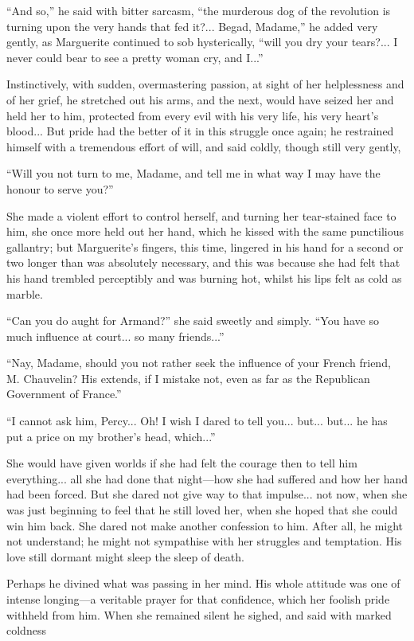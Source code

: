 \enquote{And so,} he said with bitter sarcasm, \enquote{the murderous dog of the revolution is turning upon the very hands that fed it?... Begad, Madame,} he added very gently, as Marguerite continued to sob hysterically, \enquote{will you dry your tears?... I never could bear to see a pretty woman cry, and I...}

Instinctively, with sudden, overmastering passion, at sight of her helplessness and of her grief, he stretched out his arms, and the next, would have seized her and held her to him, protected from every evil with his very life, his very heart's blood... But pride had the better of it in this struggle once again; he restrained himself with a tremendous effort of will, and said coldly, though still very gently,\longdash


\enquote{Will you not turn to me, Madame, and tell me in what way I may have the honour to serve you?}

She made a violent effort to control herself, and turning her tear-stained face to him, she once more held out her hand, which he kissed with the same punctilious gallantry; but Marguerite's fingers, this time, lingered in his hand for a second or two longer than was absolutely necessary, and this was because she had felt that his hand trembled perceptibly and was burning hot, whilst his lips felt as cold as marble.

\enquote{Can you do aught for Armand?} she said sweetly and simply. \enquote{You have so much influence at court... so many friends...}

\enquote{Nay, Madame, should you not rather seek the influence of your French friend, M. Chauvelin? His extends, if I mistake not, even as far as the Republican Government of France.}

\enquote{I cannot ask him, Percy... Oh! I wish I dared to tell you... but... but... he has put a price on my brother's head, which...}

She would have given worlds if she had felt the courage then to tell him everything... all she had done that night---how she had suffered and how her hand had been forced. But she dared not give way to that impulse... not now, when she was just beginning to feel that he still loved her, when she hoped that she could win him back. She dared not make another confession to him. After all, he might not understand; he might not sympathise with her struggles and temptation. His love still dormant might sleep the sleep of death.

Perhaps he divined what was passing in her mind. His whole attitude was one of intense longing---a veritable prayer for that confidence, which her foolish pride withheld from him. When she remained silent he sighed, and said with marked coldness\longdash


